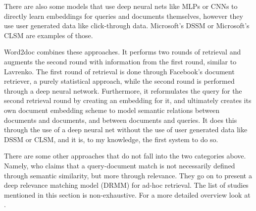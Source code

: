 There are also some models that use deep neural nets like MLPs or CNNs to directly learn embeddings for queries and documents
themselves, however they use user generated data like click-through data. Microsoft's DSSM \citep{huang2013} or Microsoft's
CLSM \citep{shen2014} are examples of those.

Word2doc combines these approaches. It performs two rounds of retrieval and augments the second round with information from the
first round, similar to Lavrenko. The first round of retrieval is done through Facebook's document retriever, a purely statistical
approach, while the second round is performed through a deep neural network. Furthermore, it reformulates the query for the
second retrieval round by creating an embedding for it, and ultimately creates its own document embedding scheme to model
semantic relations between documents and documents, and between documents and queries. It does this through the use of a deep
neural net without the use of user generated data like DSSM or CLSM, and it is, to my knowledge, the first system to do so.

\begin{minipage}{\textwidth}
There are some other approaches that do not fall into the two categories above. Namely, \cite{guo2017} who claims that a
query-document match is not necessarily defined through semantic similarity, but more through relevance. They go on to
present a deep relevance matching model (DRMM) for ad-hoc retrieval. The list of studies mentioned in this section is
non-exhaustive. For a more detailed overview look at \citet{mitra2017}.
\end{minipage}

\clearpage
